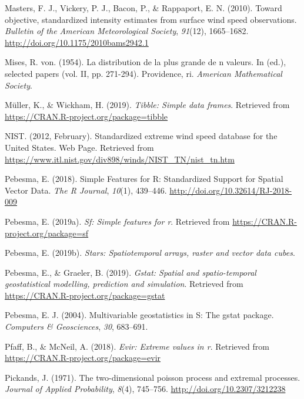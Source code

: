 \documentclass[12pt,twoside]{reedthesis}
\begin{document}
\leavevmode\hypertarget{ref-Masters2010}{}%
Masters, F. J., Vickery, P. J., Bacon, P., \& Rappaport, E. N. (2010). Toward objective, standardized intensity estimates from surface wind speed observations. \emph{Bulletin of the American Meteorological Society}, \emph{91}(12), 1665--1682. \url{http://doi.org/10.1175/2010bams2942.1}

\leavevmode\hypertarget{ref-Mises1954}{}%
Mises, R. von. (1954). La distribution de la plus grande de n valeurs. In (ed.), selected papers (vol. II, pp. 271-294). Providence, ri. \emph{American Mathematical Society}.

\leavevmode\hypertarget{ref-Mueller2019}{}%
Müller, K., \& Wickham, H. (2019). \emph{Tibble: Simple data frames}. Retrieved from \url{https://CRAN.R-project.org/package=tibble}

\leavevmode\hypertarget{ref-nist2012}{}%
NIST. (2012, February). Standardized extreme wind speed database for the United States. Web Page. Retrieved from \url{https://www.itl.nist.gov/div898/winds/NIST_TN/nist_tn.htm}

\leavevmode\hypertarget{ref-Pebesma2018}{}%
Pebesma, E. (2018). Simple Features for R: Standardized Support for Spatial Vector Data. \emph{The R Journal}, \emph{10}(1), 439--446. \url{http://doi.org/10.32614/RJ-2018-009}

\leavevmode\hypertarget{ref-Pebesma2019a}{}%
Pebesma, E. (2019a). \emph{Sf: Simple features for r}. Retrieved from \url{https://CRAN.R-project.org/package=sf}

\leavevmode\hypertarget{ref-Pebesma2019b}{}%
Pebesma, E. (2019b). \emph{Stars: Spatiotemporal arrays, raster and vector data cubes}.

\leavevmode\hypertarget{ref-Pebesma2019}{}%
Pebesma, E., \& Graeler, B. (2019). \emph{Gstat: Spatial and spatio-temporal geostatistical modelling, prediction and simulation}. Retrieved from \url{https://CRAN.R-project.org/package=gstat}

\leavevmode\hypertarget{ref-Pebesma2004}{}%
Pebesma, E. J. (2004). Multivariable geostatistics in S: The gstat package. \emph{Computers \& Geosciences}, \emph{30}, 683--691.

\leavevmode\hypertarget{ref-Pfaff2018}{}%
Pfaff, B., \& McNeil, A. (2018). \emph{Evir: Extreme values in r}. Retrieved from \url{https://CRAN.R-project.org/package=evir}

\leavevmode\hypertarget{ref-Pickands1971}{}%
Pickands, J. (1971). The two-dimensional poisson process and extremal processes. \emph{Journal of Applied Probability}, \emph{8}(4), 745--756. \url{http://doi.org/10.2307/3212238}
\end{document}
